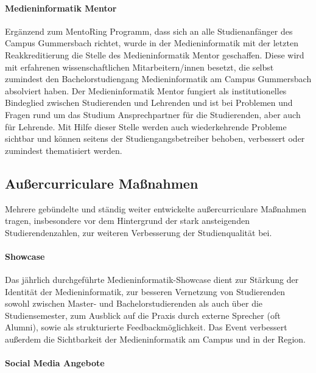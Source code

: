 \paragraph{Medieninformatik Mentor}\label{medieninformatik-mentor}

Ergänzend zum MentoRing Programm, dass sich an alle Studienanfänger des
Campus Gummersbach richtet, wurde in der Medieninformatik mit der
letzten Reakkreditierung die Stelle des Medieninformatik Mentor
geschaffen. Diese wird mit erfahrenen wissenschaftlichen
Mitarbeitern/innen besetzt, die selbst zumindest den Bachelorstudiengang
Medieninformatik am Campus Gummersbach absolviert haben. Der
Medieninformatik Mentor fungiert als institutionelles Bindeglied
zwischen Studierenden und Lehrenden und ist bei Problemen und Fragen
rund um das Studium Ansprechpartner für die Studierenden, aber auch für
Lehrende. Mit Hilfe dieser Stelle werden auch wiederkehrende Probleme
sichtbar und können seitens der Studiengangsbetreiber behoben,
verbessert oder zumindest thematisiert werden.

\subsection{Außercurriculare
Maßnahmen}\label{auuxdfercurriculare-mauxdfnahmen}

Mehrere gebündelte und ständig weiter entwickelte außercurriculare
Maßnahmen tragen, insbesondere vor dem Hintergrund der stark
ansteigenden Studierendenzahlen, zur weiteren Verbesserung der
Studienqualität bei.

\paragraph{Showcase}\label{showcase}

Das jährlich durchgeführte Medieninformatik-Showcase dient zur Stärkung
der Identität der Medieninformatik, zur besseren Vernetzung von
Studierenden sowohl zwischen Master- und Bachelorstudierenden als auch
über die Studiensemester, zum Ausblick auf die Praxis durch externe
Sprecher (oft Alumni), sowie als strukturierte Feedbackmöglichkeit. Das
Event verbessert außerdem die Sichtbarkeit der Medieninformatik am
Campus und in der Region.

\paragraph{Social Media Angebote}\label{social-media-angebote}

